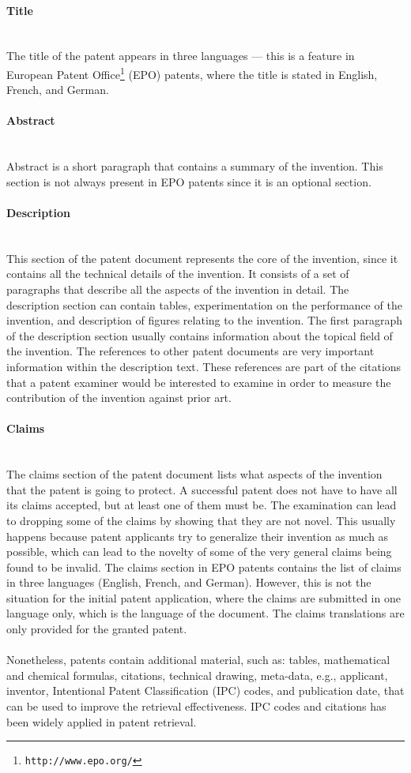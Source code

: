 \paragraph{Title}
\ \\ 
The title of the patent appears in three languages --- this is a feature in European Patent Office\footnote{\texttt{http://www.epo.org/}} (EPO)
patents, where the title is stated in English, French, and German. 
\paragraph{Abstract}
\ \\ 
Abstract is a short paragraph that contains
a summary of the invention. This section is not always present in EPO patents since it is an
optional section.
\paragraph{Description}
\ \\ 
This section of the patent document represents the core of the invention, since it contains all the
technical details of the invention. It consists of a set of paragraphs that describe all the aspects of
the invention in detail. The description
section can contain tables, experimentation on the performance of the invention, and description 
of figures relating to the invention. The first paragraph of the description section usually contains
information about the topical field of the invention. The references to other patent
documents are very important information within the description text. 
These references are part of the citations that a patent
examiner would be interested to examine in order to measure the contribution of the invention
against prior art. 
\paragraph{Claims}
\ \\ 
The claims section of the patent document lists what aspects of the invention that the patent is
going to protect. A successful patent does not have to have all its claims accepted, but at least one
of them must be. The examination can lead to dropping some of the claims by showing that they
are not novel. This usually happens because patent applicants try to generalize their invention as
much as possible, which can lead to the novelty of some of the very general claims being found to
be invalid.
The claims section in EPO patents contains the list of claims in three languages (English,
French, and German). However, this is not the situation for the initial patent application, where
the claims are submitted in one language only, which is the language of the document. The
claims translations are only provided for the granted patent.\\\\
Nonetheless, patents contain
additional material, such as: tables, mathematical and chemical formulas, citations,
technical drawing, meta-data, e.g., applicant, inventor, Intentional Patent Classification 
(IPC) codes, and publication date, that can be used to improve the retrieval effectiveness.
IPC codes and citations has been widely applied in patent retrieval. 
